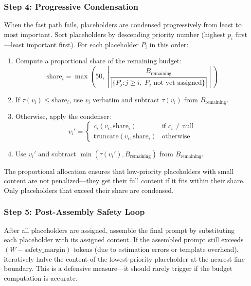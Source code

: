 \documentclass[11pt]{article}
\begin{document}
\subsubsection{Step 4: Progressive Condensation}

When the fast path fails, placeholders are condensed progressively
from least to most important.  Sort placeholders by descending
priority number (highest $p_i$ first---least important first).  For
each placeholder $P_i$ in this order:

\begin{enumerate}
  \item Compute a proportional share of the remaining budget:
    \begin{equation}
    \text{share}_i = \max\!\left(50, \left\lfloor \frac{B_{\text{remaining}}}{|\{P_j : j \geq i,\; P_j \text{ not yet assigned}\}|}\right\rfloor\right)
    \label{eq:share}
    \end{equation}

  \item If $\tau(v_i) \leq \text{share}_i$, use $v_i$ verbatim and
    subtract $\tau(v_i)$ from $B_{\text{remaining}}$.

  \item Otherwise, apply the condenser:
    \begin{equation}
    v_i' =
    \begin{cases}
    c_i(v_i, \text{share}_i) & \text{if } c_i \neq \text{null} \\
    \text{truncate}(v_i, \text{share}_i) & \text{otherwise}
    \end{cases}
    \label{eq:condense}
    \end{equation}

  \item Use $v_i'$ and subtract $\min(\tau(v_i'), B_{\text{remaining}})$
    from $B_{\text{remaining}}$.
\end{enumerate}

The proportional allocation ensures that low-priority placeholders
with small content are not penalized---they get their full content if
it fits within their share.  Only placeholders that exceed their share
are condensed.

\subsubsection{Step 5: Post-Assembly Safety Loop}

After all placeholders are assigned, assemble the final prompt by
substituting each placeholder with its assigned content.  If the
assembled prompt still exceeds $(W - \text{safety\_margin})$ tokens
(due to estimation errors or template overhead), iteratively halve
the content of the lowest-priority placeholder at the nearest line
boundary.  This is a defensive measure---it should rarely trigger if
the budget computation is accurate.
\end{document}
